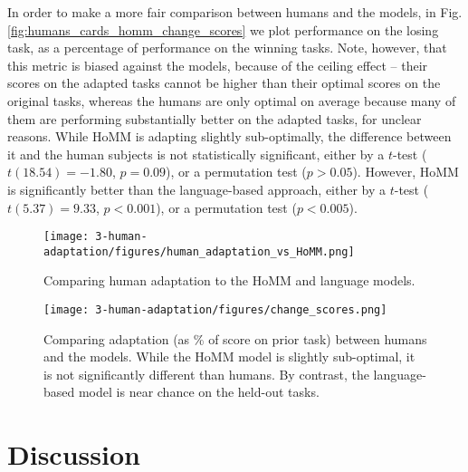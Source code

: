 In order to make a more fair comparison between humans and the models, in Fig. \ref{fig:humans_cards_homm_change_scores} we plot performance on the losing task, as a percentage of performance on the winning tasks. Note, however, that this metric is biased against the models, because of the ceiling effect -- their scores on the adapted tasks cannot be higher than their optimal scores on the original tasks, whereas the humans are only optimal on average because many of them are performing substantially better on the adapted tasks, for unclear reasons. While HoMM is adapting slightly sub-optimally, the difference between it and the human subjects is not statistically significant, either by a \(t\)-test (\(t(18.54) = -1.80\), \(p = 0.09\)), or a permutation test (\(p > 0.05\)). However, HoMM is significantly better than the language-based approach, either by a   \(t\)-test (\(t(5.37) = 9.33\), \(p < 0.001\)), or a permutation test (\(p < 0.005\)). \par

\begin{figure}
\centering
\texttt{[image: 3-human-adaptation/figures/human\_adaptation\_vs\_HoMM.png]}
\caption{Comparing human adaptation to the HoMM and language models.}\label{fig:human_cards_homm_results}
\end{figure}

\begin{figure}
\centering
\texttt{[image: 3-human-adaptation/figures/change\_scores.png]}
\caption{Comparing adaptation (as \% of score on prior task) between humans and the models. While the HoMM model is slightly sub-optimal, it is not significantly different than humans. By contrast, the language-based model is near chance on the held-out tasks.} \label{fig:human_cards_homm_change_scores}
\end{figure}

\section{Discussion}

